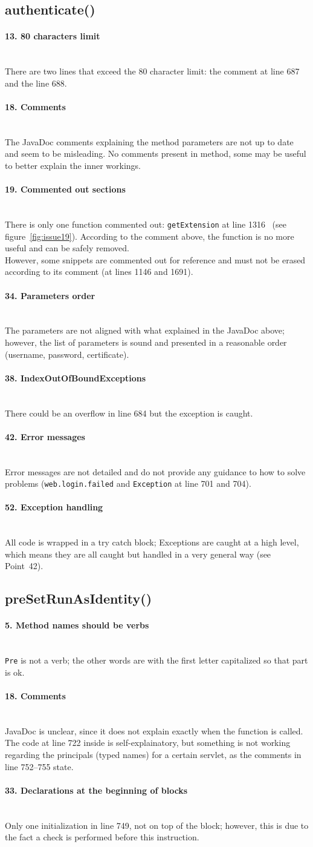 \documentclass[english]{article}
\newcommand{\code}[1]{\texttt{#1}}
\newcommand{\issue}[3][?]{
    \paragraph{#1. #2} \mbox{}\\ #3
}
\begin{document}
\subsection{authenticate()} %
\issue[13]{80 characters limit}{
    There are two lines that exceed the 80 character limit: the comment
    at line 687 and the line 688. 
}

\issue[18]{Comments} {
The JavaDoc comments explaining the method parameters are not up to date 
and seem to be misleading. No comments present in method, some may be useful 
to better explain the inner workings.
}

\issue[19]{Commented out sections} {
    There is only one function commented out: \code{getExtension} at line 1316 \
    (see figure~\ref{fig:issue19}).
    According to the comment above, the function is no more useful and can 
    be safely removed.  \\
    However, some snippets are commented out for reference and must not be 
    erased according to its comment (at lines 1146 and 1691). 
}

\issue[34]{Parameters order} {
    The parameters are not aligned with what explained in the JavaDoc above; 
    however, the list of parameters is sound and presented in a reasonable order (username, password, certificate). 
}

\issue[38]{IndexOutOfBoundExceptions} {
    There could be an overflow in line 684 but the exception is caught.
}

\issue[42]{Error messages} {
Error messages are not detailed and do not provide any guidance to 
how to solve problems (\code{web.login.failed} and \code{Exception} at
line 701 and 704).
}

\issue[52]{Exception handling} {
All code is wrapped in a try catch block; Exceptions are caught at a high level, 
which means they are all caught but handled in a very general way 
(see Point~42).
}

\subsection{preSetRunAsIdentity()}

\issue[5]{Method names should be verbs} {
    \code{Pre} is not a verb; the other words are with the first letter
    capitalized so that part is ok.
}

\issue[18]{Comments} {
JavaDoc is unclear, since it does not explain exactly when the function is 
called. The code at line 722 inside is self-explainatory, but something is 
not working regarding the principals (typed names) for a certain servlet, 
as the comments in line 752--755 state.
}
\issue[33]{Declarations at the beginning of blocks} {
Only one initialization in line 749, not on top of the block; however, 
this is due to the fact a check is performed before this instruction.
}
\end{document}

